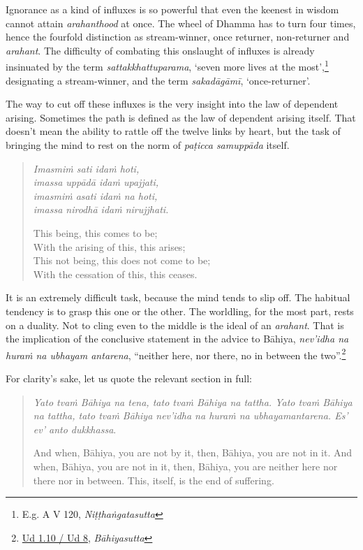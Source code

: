 Ignorance as a kind of influxes is so powerful that even the keenest in wisdom cannot attain \emph{arahanthood} at once. The wheel of Dhamma has to turn four times, hence the fourfold distinction as stream-winner, once returner, non-returner and \emph{arahant}. The difficulty of combating this onslaught of influxes is already insinuated by the term \emph{sattakkhattuparama}, `seven more lives at the most',\footnote{E.g. A V 120, \emph{Niṭṭhaṅgatasutta}} designating a stream-winner, and the term \emph{sakadāgāmī}, `once-returner'.

The way to cut off these influxes is the very insight into the law of dependent arising. Sometimes the path is defined as the law of dependent arising itself. That doesn't mean the ability to rattle off the twelve links by heart, but the task of bringing the mind to rest on the norm of \emph{paṭicca samuppāda} itself.

\begin{quote}
\emph{Imasmiṁ sati idaṁ hoti,}\\
\emph{imassa uppādā idaṁ upajjati,}\\
\emph{imasmiṁ asati idaṁ na hoti,}\\
\emph{imassa nirodhā idaṁ nirujjhati.}

This being, this comes to be;\\
With the arising of this, this arises;\\
This not being, this does not come to be;\\
With the cessation of this, this ceases.
\end{quote}

It is an extremely difficult task, because the mind tends to slip off. The habitual tendency is to grasp this one or the other. The worldling, for the most part, rests on a duality. Not to cling even to the middle is the ideal of an \emph{arahant}. That is the implication of the conclusive statement in the advice to Bāhiya, \emph{nev'idha na huraṁ na ubhayam antarena}, ``neither here, nor there, no in between the two''.\footnote{\href{https://suttacentral.net/ud1.10/pli/ms}{Ud 1.10 / Ud 8}, \emph{Bāhiyasutta}}

For clarity's sake, let us quote the relevant section in full:

\begin{quote}
\emph{Yato tvaṁ Bāhiya na tena, tato tvaṁ Bāhiya na tattha. Yato tvaṁ Bāhiya na tattha, tato tvaṁ Bāhiya nev'idha na huraṁ na ubhayamantarena. Es' ev' anto dukkhassa}.

And when, Bāhiya, you are not by it, then, Bāhiya, you are not in it. And when, Bāhiya, you are not in it, then, Bāhiya, you are neither here nor there nor in between. This, itself, is the end of suffering.
\end{quote}

